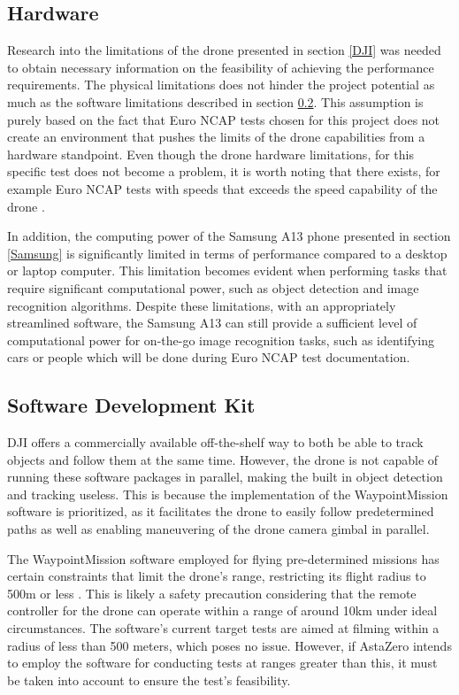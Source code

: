 \subsection{Hardware} \label{Dron limitations}
Research into the limitations of the drone presented in section \ref{DJI} was needed to obtain necessary information on the feasibility of achieving the performance requirements. The physical limitations does not hinder the project potential as much as the software limitations described in section \ref{limits of dji sdk}. This assumption is purely based on the fact that Euro NCAP tests chosen for this project does not create an environment that pushes the limits of the drone capabilities from a hardware standpoint. Even though the drone hardware limitations, for this specific test does not become a problem, it is worth noting that there exists, for example Euro NCAP tests \cite{speed_euro_ncap} with speeds that exceeds the speed capability of the drone \cite{DJI2021MAVICSERIES}.
\newline 

In addition, the computing power of the Samsung A13 phone presented in section \ref{Samsung} is significantly limited in terms of performance compared to a desktop or laptop computer. This limitation becomes evident when performing tasks that require significant computational power, such as object detection and image recognition algorithms. Despite these limitations, with an appropriately streamlined software, the Samsung A13 can still provide a sufficient level of computational power for on-the-go image recognition tasks, such as identifying cars or people which will be done during Euro NCAP test documentation.


\subsection{Software Development Kit} \label{limits of dji sdk}
DJI offers a commercially available off-the-shelf way to both be able to track objects and follow them at the same time. However, the drone is not capable of running these software packages in parallel, making the built in object detection and tracking useless. This is because the implementation of the WaypointMission software is prioritized, as it facilitates the drone to easily follow predetermined paths as well as enabling maneuvering of the drone camera gimbal in parallel.  
\newline
\label{sec:limit_WP}

The WaypointMission software employed for flying pre-determined missions has certain constraints that limit the drone's range, restricting its flight radius to 500m or less \cite{WaypointMission}. This is likely a safety precaution considering that the remote controller for the drone can operate within a range of around 10km under ideal circumstances. The software's current target tests are aimed at filming within a radius of less than 500 meters, which poses no issue. However, if AstaZero intends to employ the software for conducting tests at ranges greater than this, it must be taken into account to ensure the test's feasibility.
\newline

